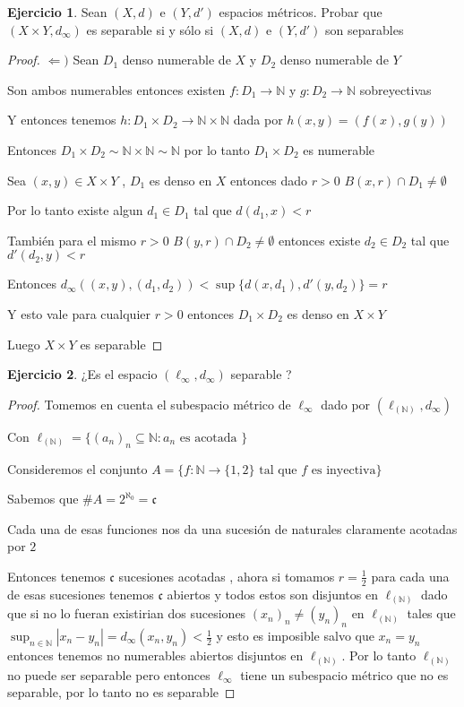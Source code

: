 \documentclass[12pt]{article}
\newcommand{\n}{\aleph_{0}}
\newcommand{\N}{\mathbb{N}}
\newcommand{\ra}{\rightarrow}
\theoremstyle{definition}
\newtheorem{ej}{Ejercicio}
\begin{document}
\begin{ej}
  Sean $(X,d)$ e $(Y,d')$ espacios métricos. Probar que $(X \times Y,d_{\infty})$ es separable si y sólo si $(X,d)$ e $(Y,d')$ son separables
  \begin{proof}
  $\Leftarrow )$ Sean $D_1$ denso numerable de $X$ y $D_2$ denso numerable de $Y$

  Son ambos numerables entonces existen $f: D_1 \ra \N$ y $g: D_2 \ra \N$ sobreyectivas

  Y entonces tenemos $h: D_1 \times D_2 \ra \N \times \N$ dada por $h(x,y) = (f(x),g(y))$

  Entonces $D_1 \times D_2 \sim \N \times \N \sim \N$ por lo tanto $D_1 \times D_2$ es numerable

  Sea $(x,y) \in X \times Y$ , $D_1$ es denso en $X$ entonces dado $r>0$ $B(x,r) \cap D_1 \neq \emptyset$

  Por lo tanto existe algun $d_1 \in D_1 $ tal que $d(d_1,x) < r$

  También para el mismo $r > 0$ $B(y,r) \cap D_2 \neq \emptyset$ entonces existe $d_2 \in D_2$ tal que $d'(d_2,y) < r$

  Entonces $d_{\infty}((x,y),(d_1,d_2)) < \sup \{d(x,d_1),d'(y,d_2)\} = r$

  Y esto vale para cualquier $r>0$ entonces $D_1 \times D_2$ es denso en $X \times Y$

  Luego $X \times Y$ es separable
  \end{proof}
\end{ej}
\begin{ej}
  ¿Es el espacio $(\ell_{\infty},d_{\infty})$ separable ? 
  \begin{proof}
    Tomemos en cuenta el subespacio métrico de $\ell_{\infty}$ dado por $(\ell_{(\N)}, d_{\infty})$

    Con $\ell_{(\N)} = \{(a_n)_n \subseteq \N : a_n \text{ es acotada }\}$

    Consideremos el conjunto $A = \{f: \N \ra \{1,2\} \text{ tal que } f \text{ es inyectiva}\}$

    Sabemos que $\# A = 2^{\n} = \mathfrak{c}$

 Cada una de esas funciones nos da una sucesión de naturales claramente acotadas por $2$

 Entonces tenemos $\mathfrak{c}$ sucesiones acotadas , ahora si tomamos $r = \frac{1}{2}$ para cada una de esas sucesiones tenemos $\mathfrak{c}$ abiertos y todos estos son disjuntos en $\ell_{(\N)}$ dado que si no lo fueran existirian dos sucesiones $(x_n)_n \neq (y_n)_n$ en $ \ell_{(\N)}$ tales que $\sup_{n \in \N}|x_n - y_n| = d_{\infty}(x_n,y_n) < \frac{1}{2}$  y esto es imposible salvo que $x_n  = y_n$ entonces tenemos no numerables abiertos disjuntos en $\ell_{(\N)}$. Por lo tanto $\ell_{(\N)}$ no puede ser separable pero entonces $\ell_{\infty}$ tiene un subespacio métrico que no es separable, por lo tanto no es separable
  \end{proof}
\end{ej}
\end{document}

